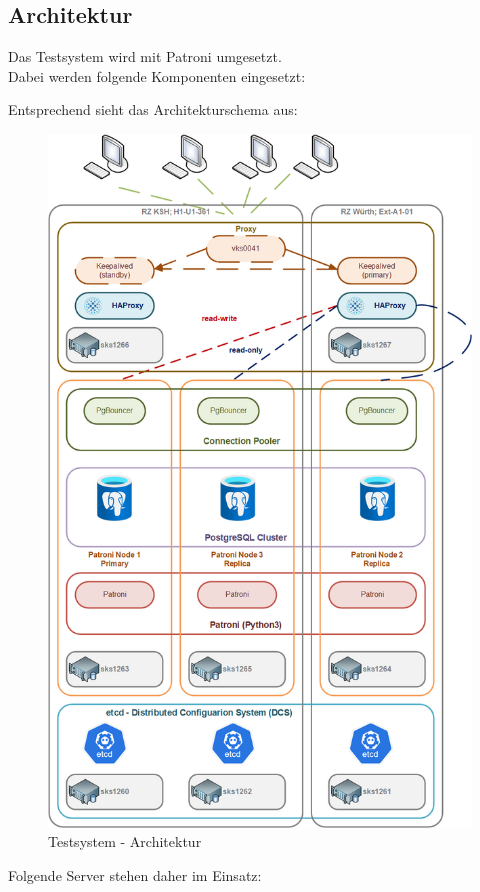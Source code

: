 
\begin{flushleft}
    \subsection{Architektur}
    Das Testsystem wird mit Patroni umgesetzt.\\
    Dabei werden folgende Komponenten eingesetzt:\\
    
\end{flushleft}
\begin{flushleft}
    Entsprechend sieht das Architekturschema aus:
    \begin{figure}[H]
        \centering
        \includegraphics[width=1\linewidth]{source/implementation/construction_implementation/patroni-construction-architecture}
        \caption{Testsystem - Architektur}
        \label{fig:patroni-construction-architecture}
    \end{figure}
\end{flushleft}
\begin{flushleft}
    Folgende Server stehen daher im Einsatz:
    
\end{flushleft}